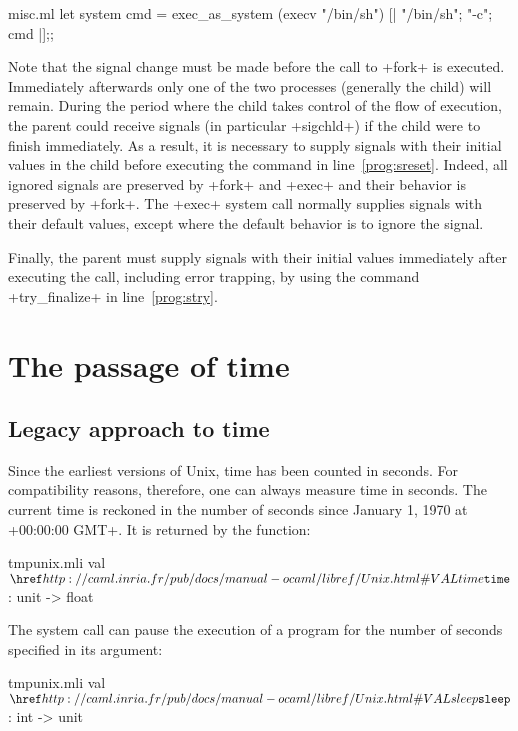 \begin{example}
\begin{listingcodefile}[style=numbers]{misc.ml}
let system cmd = 
  exec_as_system (execv "/bin/sh") [| "/bin/sh"; "-c"; cmd |];;
\end{listingcodefile}
%

Note that the signal change must be made before the call to \ml+fork+ is
executed.  Immediately afterwards only one of the two processes
(generally the child) will remain.  During the period where the child
takes control of the flow of execution, the parent could receive signals
(in particular \ml+sigchld+) if the child were to finish immediately.  As a
result, it is necessary to supply signals with their initial values in
the child before executing the command in line~\ref{prog:sreset}.
Indeed, all ignored signals are preserved by \ml+fork+ and \ml+exec+
and their behavior is preserved by \ml+fork+.  The
\ml+exec+ system call normally supplies signals with their default values, except
where the default behavior is to ignore the
signal.

Finally, the parent must supply signals with their initial values
immediately after executing the call, including error trapping, by 
using the command \ml+try_finalize+ in line~\ref{prog:stry}.
\end{example}


\section{The passage of time}

\subsection*{Legacy approach to time}

Since the earliest versions of Unix, time has been counted in seconds.
For compatibility reasons, therefore, one can always measure time in seconds.
The current time is reckoned in the number of seconds since January 1, 1970
at \ml+00:00:00 GMT+.  It is returned by the function:

%
\begin{listingcodefile}{tmpunix.mli}
val $\indexlibvalue{Unix}{time}$ : unit -> float
\end{listingcodefile}
%

The  system call can pause the execution of a program
for the number of seconds specified in its argument:
%
\begin{listingcodefile}{tmpunix.mli}
val $\libvalue{Unix}{sleep}$ : int -> unit
\end{listingcodefile}
%


